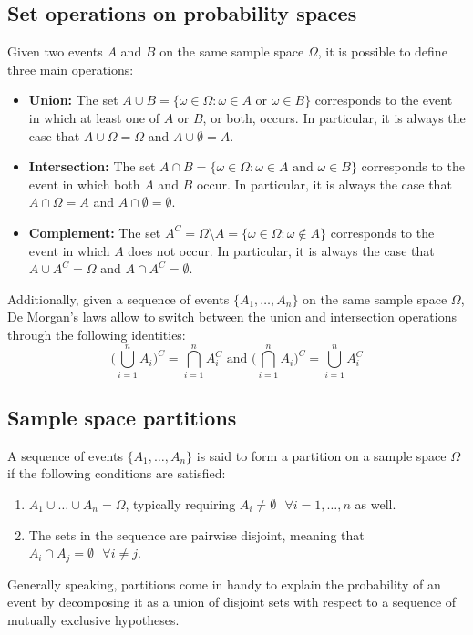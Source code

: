 \documentclass{report}
\begin{document}
\subsection{Set operations on probability spaces}
Given two events $\displaystyle A$ and $\displaystyle B$ on the same sample space $\displaystyle \Omega$, it is possible to define three main operations:
\begin{itemize}
    \item \textbf{Union: }The set $\displaystyle A \cup B = \{\omega \in \Omega: \omega \in A \text{ or } \omega \in B\}$ corresponds to the event in which at least one of $\displaystyle A$ or $\displaystyle B$, or both, occurs. \newline
    In particular, it is always the case that $\displaystyle A \cup \Omega = \Omega$ and $\displaystyle A \cup \emptyset = A$.
    \item \textbf{Intersection: }The set $\displaystyle A \cap B = \{\omega \in \Omega : \omega \in A \text{ and } \omega \in B\}$ corresponds to the event in which both $\displaystyle A$ and $\displaystyle B$ occur. \newline
    In particular, it is always the case that $\displaystyle A \cap \Omega = A$ and $\displaystyle A \cap \emptyset = \emptyset$.
    \item \textbf{Complement: }The set $\displaystyle A^C = \Omega \setminus A = \{\omega \in \Omega: \omega \notin A\}$ corresponds to the event in which $\displaystyle A$ does not occur. \newline
    In particular, it is always the case that $\displaystyle A \cup A^C = \Omega$ and $\displaystyle A \cap A^C = \emptyset$.
\end{itemize}
Additionally, given a sequence of events $\displaystyle \{A_1, \dots, A_n\}$ on the same sample space $\displaystyle \Omega$, De Morgan's laws allow to switch between the union and intersection operations through the following identities:
\[\Bigg(\bigcup_{i = 1}^n A_i\Bigg)^C = \bigcap_{i = 1}^n A_i^C \text{ and } \Bigg(\bigcap_{i = 1}^n A_i\Bigg)^C = \bigcup_{i = 1}^n A_i^C\]
\subsection{Sample space partitions}
A sequence of events $\displaystyle \{A_1, \dots, A_n\}$ is said to form a partition on a sample space $\displaystyle \Omega$ if the following conditions are satisfied:
\begin{enumerate}
    \item $\displaystyle A_1 \cup \dots \cup A_n = \Omega$, typically requiring $\displaystyle A_i \neq \emptyset \text{ } \forall i =1, \dots, n$ as well.
    \item The sets in the sequence are pairwise disjoint, meaning that $\displaystyle A_i \cap A_j = \emptyset \text{ } \forall i \neq j$.
\end{enumerate}
Generally speaking, partitions come in handy to explain the probability of an event by decomposing it as a union of disjoint sets with respect to a sequence of mutually exclusive hypotheses.
\end{document}
